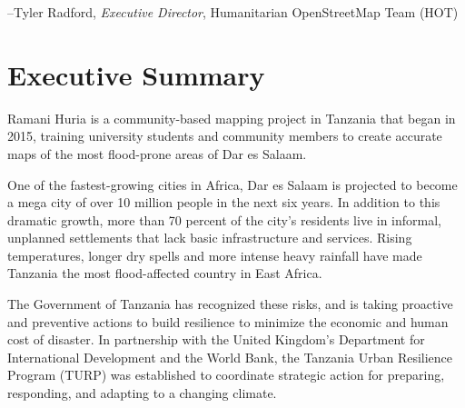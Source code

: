 \documentclass[a4paper,12pt,twoside]{article}
\begin{document}

--Tyler Radford, \textit{Executive Director}, Humanitarian OpenStreetMap Team (HOT)
\clearpage

\newpage
\section{Executive Summary}
\label{executivesummary}
\begin{multicols}{2}

Ramani Huria is a community-based mapping project in Tanzania that began in 2015, training university students and community members to create accurate maps of the most flood-prone areas of Dar es Salaam. 

One of the fastest-growing cities in Africa, Dar es Salaam is projected to become a mega city of over 10 million people in the next six years. In addition to this dramatic growth, more than 70 percent of the city's residents live in informal, unplanned settlements that lack basic infrastructure and services. Rising temperatures, longer dry spells and more intense heavy rainfall have made Tanzania the most flood-affected country in East Africa.

The Government of Tanzania has recognized these risks, and is taking proactive and preventive actions to build resilience to minimize the economic and human cost of disaster. In partnership with the United Kingdom's Department for International Development and the World Bank, the Tanzania Urban Resilience Program (TURP) was established to coordinate strategic action for preparing, responding, and adapting to a changing climate.


\end{multicols}
\end{document}
\end{multicols}
\end{document}
